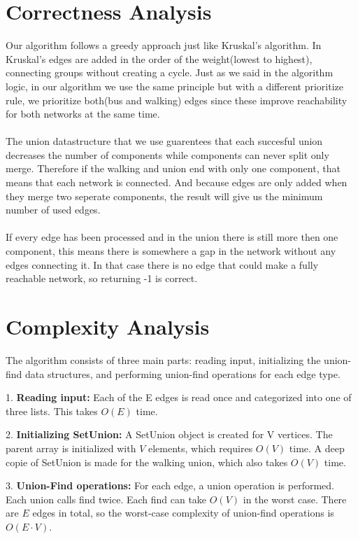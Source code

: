 \documentclass[a4paper]{article}
\begin{document}
\section{Correctness Analysis}
Our algorithm follows a greedy approach just like Kruskal's algorithm. In Kruskal's edges are added in the order of the weight(lowest to highest), connecting groups without creating a cycle. Just as we said in the algorithm logic, in our algorithm we use the same principle but with a different prioritize rule, we prioritize both(bus and walking) edges since these improve reachability for both networks at the same time.
\\
\\
The union datastructure that we use guarentees that each succesful union decreases the number of components while components can never split only merge.
Therefore if the walking and union end with only one component, that means that each network is connected.
And because edges are only added when they merge two seperate components, the result will give us the minimum number of used edges. 
\\
\\
If every edge has been processed and in the union there is still more then one component, this means there is somewhere a gap in the network without any edges connecting it. 
In that case there is no edge that could make a fully reachable network, so returning -1 is correct.



\section{Complexity Analysis}
The algorithm consists of three main parts: reading input, initializing the union-find data structures, and performing union-find operations for each edge type. 

1. \textbf{Reading input:} Each of the E edges is read once and categorized into one of three lists. This takes $O(E)$ time. 

2. \textbf{Initializing SetUnion:} A SetUnion object is created for V vertices. The parent array is initialized with $V$ elements, which requires $O(V)$ time. A deep copie of SetUnion is made for the walking union, which also takes $O(V)$ time.

3. \textbf{Union-Find operations:} For each edge, a union operation is performed. Each union calls find twice. Each find can take $O(V)$ in the worst case. There are $E$ edges in total, so the worst-case complexity of union-find operations is $O(E \cdot V)$.  
\end{document}
